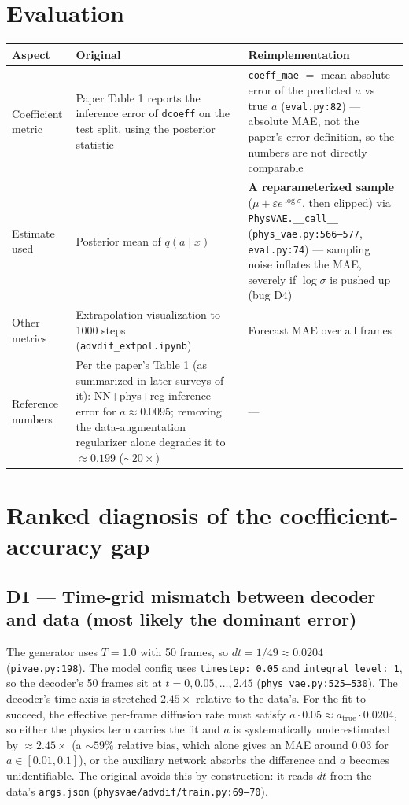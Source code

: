 \documentclass[11pt,a4paper]{article}
\newcommand{\code}[1]{\texttt{#1}}
\begin{document}
\section{Evaluation}
\label{sec:eval}

\begin{table}[h]
\centering
\small
\begin{tabularx}{\textwidth}{LXX}
\toprule
\textbf{Aspect} & \textbf{Original} & \textbf{Reimplementation} \\
\midrule
Coefficient metric & Paper Table 1 reports the inference error of \code{dcoeff} on the test split, using the posterior statistic & \code{coeff\_mae} $=$ mean absolute error of the predicted $a$ vs true $a$ (\code{eval.py:82}) --- absolute MAE, not the paper's error definition, so the numbers are not directly comparable \\
Estimate used & Posterior mean of $q(a \mid x)$ & \textbf{A reparameterized sample} ($\mu + \varepsilon e^{\log\sigma}$, then clipped) via \code{PhysVAE.\_\_call\_\_} (\code{phys\_vae.py:566--577}, \code{eval.py:74}) --- sampling noise inflates the MAE, severely if $\log\sigma$ is pushed up (bug D4) \\
Other metrics & Extrapolation visualization to 1000 steps (\code{advdif\_extpol.ipynb}) & Forecast MAE over all frames \\
Reference numbers & Per the paper's Table 1 (as summarized in later surveys of it): NN+phys+reg inference error for $a \approx 0.0095$; removing the data-augmentation regularizer alone degrades it to $\approx 0.199$ ($\sim20\times$) & --- \\
\bottomrule
\end{tabularx}
\end{table}

\section{Ranked diagnosis of the coefficient-accuracy gap}
\label{sec:diagnosis}

\subsection*{D1 --- Time-grid mismatch between decoder and data (most likely the dominant error)}

The generator uses $T = 1.0$ with 50 frames, so $dt = 1/49 \approx 0.0204$
(\code{pivae.py:198}). The model config uses \code{timestep: 0.05} and
\code{integral\_level: 1}, so the decoder's 50 frames sit at
$t = 0, 0.05, \dots, 2.45$ (\code{phys\_vae.py:525--530}). The decoder's time axis is
stretched $2.45\times$ relative to the data's. For the fit to succeed, the effective
per-frame diffusion rate must satisfy $a \cdot 0.05 \approx a_\mathrm{true} \cdot 0.0204$,
so either the physics term carries the fit and $a$ is systematically underestimated by
$\approx 2.45\times$ (a $\sim59\%$ relative bias, which alone gives an MAE around
$0.03$ for $a \in [0.01, 0.1]$), or the auxiliary network absorbs the difference and
$a$ becomes unidentifiable. The original avoids this by construction: it reads $dt$
from the data's \code{args.json} (\code{physvae/advdif/train.py:69--70}).
\end{document}
